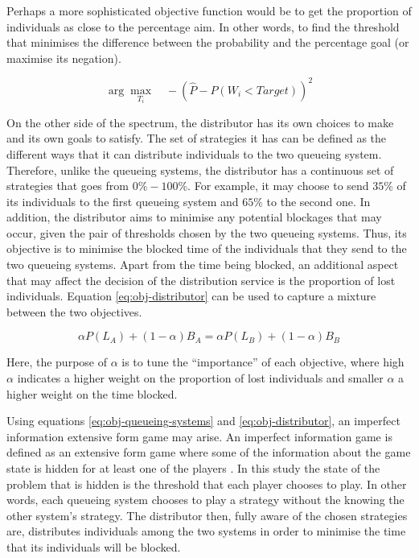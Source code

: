 Perhaps a more sophisticated objective function would be to get the proportion 
of individuals as close to the percentage aim. 
In other words, to find the threshold that minimises the difference between the 
probability and the percentage goal (or maximise its negation).

\begin{equation}\label{eq:obj-queueing-systems}
    \arg \max_{T_i} \quad -\left( \hat{P} - P(W_i < \textit{Target}) \right)^2
\end{equation}


On the other side of the spectrum, the distributor has its own choices 
to make and its own goals to satisfy.
The set of strategies it has can be defined as the different ways that it can 
distribute individuals to the two queueing system.
Therefore, unlike the queueing systems, the distributor has a 
continuous set of strategies that goes from \( 0\% - 100\% \). 
For example, it may choose to send \(35\%\) of its individuals to the first 
queueing system and \(65\%\) to the second one.
In addition, the distributor aims to minimise any potential blockages
that may occur, given the pair of thresholds chosen by the two queueing systems.
Thus, its objective is to minimise the blocked time of the individuals 
that they send to the two queueing systems.
Apart from the time being blocked, an additional aspect that may affect the 
decision of the distribution service is the proportion of lost individuals.
Equation \ref{eq:obj-distributor} can be used to capture a mixture 
between the two objectives.

\begin{equation}\label{eq:obj-distributor}
    \alpha P(L_A) + (1 - \alpha) B_A = 
    \alpha P(L_B) + (1 - \alpha) B_B
\end{equation}

Here, the purpose of \(\alpha\) is to tune the ``importance'' of each objective,
where high \(\alpha\) indicates a higher weight on the proportion of lost 
individuals and smaller \(\alpha\) a higher weight on the time blocked. 


Using equations \ref{eq:obj-queueing-systems} and \ref{eq:obj-distributor}, an
imperfect information extensive form game may arise. 
An imperfect information game is defined as an extensive form game where some 
of the information about the game state is hidden for at least one of the 
players \cite{Berwanger2008}. In this study the state of the problem that is
hidden is the threshold that each player chooses to play.
In other words, each queueing system chooses to play a strategy without the 
knowing the other system's strategy.
The distributor then, fully aware of the chosen strategies are, distributes 
individuals among the two systems in order to minimise the time that its 
individuals will be blocked. 


